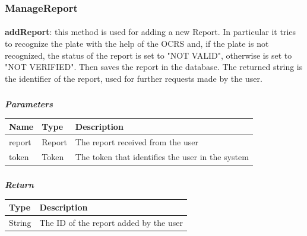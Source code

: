 				\subsubsection{ManageReport}
					\paragraph{}
							\textbf{addReport}: this method is used for adding a new Report. In particular it tries to recognize the  plate with the help of the OCRS and, if the plate is not recognized, the status of the report is set to "NOT VALID", otherwise is set to "NOT VERIFIED". Then saves the report in the database. The returned string is the identifier of the report, used for further requests made by the user. 
							\subparagraph{}
							\textit{\textbf{Parameters}}
								\begin{table}[!h]
									\begin{tabular}{L{0.2\textwidth}L{0.2\textwidth}L{0.2\textwidth}}
										\toprule
										Name & Type & Description \\
										\midrule
								  		report & Report & The report received from the user \\
								  		token & Token & The token that identifies the user in the system \\
								 		\bottomrule
									\end{tabular}
								\end{table}
							\subparagraph{}
								\textit{\textbf{Return}}
									\begin{table}[!h]
									\begin{tabular}{L{0.3\textwidth}L{0.3\textwidth}}
										\toprule
										Type & Description \\
										\midrule
								  		String & The ID of the report added by the user \\
								 		\bottomrule
									\end{tabular}
								\end{table}
					
